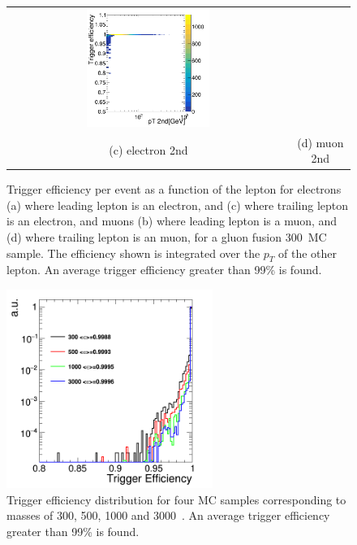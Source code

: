 \begin{figure}[htbp]
\begin{tabular}{cc}
 \includegraphics[width=0.45\textwidth]{../AN/Figs/Trigger/mu2.png} \\
 (c) electron 2nd & (d) muon 2nd \\
\end{tabular}
\caption{
      Trigger efficiency per event
      as a function of the lepton \pt
      for electrons (a) where leading lepton is an electron, 
      and (c) where trailing lepton is an electron, 
      and muons (b) where leading lepton is a muon, 
      and (d) where trailing lepton is an muon, 
      for a gluon fusion 300~\GeV MC sample.
      The efficiency shown is integrated over the $p_T$ of the other lepton.
      An average trigger efficiency greater than 99\% is found.      
     }
    \label{Fig:trigger}
\end{figure}
\begin{figure}[htbp]
\centering
 \includegraphics[width=0.6\textwidth]{../AN/Figs/Trigger/triggW.png}
\caption{
      Trigger efficiency distribution for 
      four MC samples corresponding to masses of 300, 500, 1000 and 3000~\GeV.
      An average trigger efficiency greater than 99\% is found.
     }
    \label{Fig:triggerIntegral}
\end{figure}



